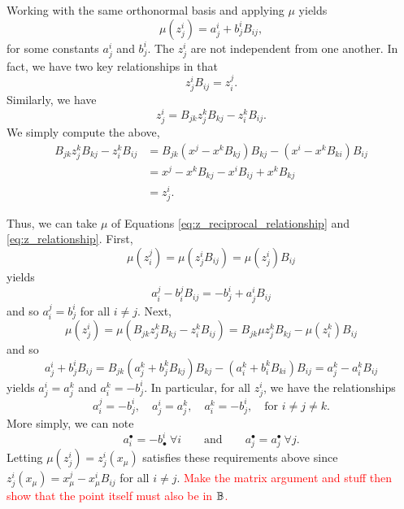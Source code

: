 Working with the same orthonormal basis and applying $\mu$ yields
\[
\mu(z_j^i) = a_j^i + b_j^i B_{ij},
\]
for some constants $a_j^i$ and $b_j^i$.  The $z_j^i$ are not independent from one another.  In fact, we have two key relationships in that
\begin{equation}
\label{eq:z_reciprocal_relationship}
z_j^i B_{ij}  = z_i^j.
\end{equation}
Similarly, we have
\begin{equation}
\label{eq:z_relationship}
z_j^i = B_{jk} z_j^k B_{kj} - z_i^k B_{ij}.
\end{equation}
We simply compute the above,
\begin{align*}
B_{jk} z_j^k B_{kj} - z_i^k B_{ij} &= B_{jk} (x^j-x^k B_{kj}) B_{kj} - (x^i -x^k B_{ki}) B_{ij}\\
    &= x^j -x^k B_{kj} -x^i B_{ij} +x^k B_{kj}\\
    &= z_j^i.
\end{align*}

Thus, we can take $\mu$ of Equations \ref{eq:z_reciprocal_relationship} and \ref{eq:z_relationship}. First, 
\[
\mu(z_i^j) = \mu(z_j^i B_{ij}) = \mu(z_j^i) B_{ij}
\]
yields
\[
a_i^j - b_i^j B_{ij} = -b_j^i + a_j^i B_{ij}
\]
and so $a_i^j = b_j^i$ for all $i \neq j$. Next,
\[
\mu(z_j^i) = \mu(B_{jk} z_j^k B_{kj} - z_i^k B_{ij}) = B_{jk} \mu{z_j^k} B_{kj} - \mu(z_i^k) B_{ij}
\]
and so
\[
a_j^i + b_j^i B_{ij} = B_{jk} (a_j^k +b_j^k B_{kj}) B_{kj} - (a_i^k + b_i^k B_{ki}) B_{ij} = a_j^k - a_i^k B_{ij}
\]
yields $a_j^i = a_j^k$ and $a_i^k=-b_j^i$. In particular, for all $z_j^i$, we have the relationships
\[
a_i^j =- b_j^i, \quad a_j^i = a_j^k, \quad a_i^k =- b_j^i, \quad \textrm{for $i\neq j \neq k$.}
\]
More simply, we can note 
\[
a_i^\bullet = - b_\bullet^i ~\forall i \qquad \textrm{and} \qquad  a_j^\bullet = a_j^\bullet ~\forall j.
\]
Letting $\mu(z_j^i) = z_j^i(x_\mu)$ satisfies these requirements above since $z_j^i(x_\mu) = x_\mu^j - x_\mu^i B_{ij}$ for all $i\neq j$. 
\textcolor{red}{Make the matrix argument and stuff then show that the point itself must also be in $\mathbb{B}$.}



